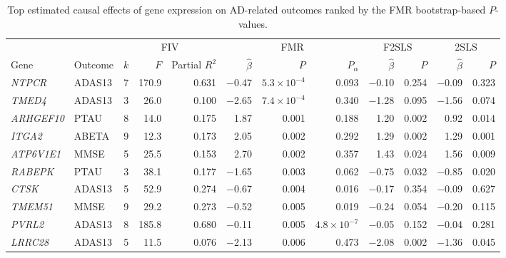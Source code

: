 \begin{table}[H]\centering\small
\caption{Top estimated causal effects of gene expression on AD-related outcomes ranked by the FMR bootstrap-based $P$-values.}\label{tab:2}
\begin{tabular}{llrrrrrrrrrr}
\toprule
 & & \multicolumn{3}{c}{FIV} & \multicolumn{3}{c}{FMR} & \multicolumn{2}{c}{F2SLS} & \multicolumn{2}{c}{2SLS} \\
\cmidrule(lr){3-5}\cmidrule(lr){6-8}\cmidrule(lr){9-10}\cmidrule(lr){11-12}
Gene & Outcome & $k$ & $F$ & Partial $R^2$ & $\hat\beta$ & $P$ & $P_\alpha$ & $\hat\beta$ & $P$ & $\hat\beta$ & $P$ \\
\midrule
\textit{NTPCR} & ADAS13 & 7 & 170.9 & 0.631 & $-$0.47 & $5.3\times10^{-4}$ & 0.093 & $-$0.10 & 0.254 & $-$0.09 & 0.323 \\
\textit{TMED4} & ADAS13 & 3 & 26.0 & 0.100 & $-$2.65 & $7.4\times10^{-4}$ & 0.340 & $-$1.28 & 0.095 & $-$1.56 & 0.074 \\
\textit{ARHGEF10} & PTAU & 8 & 14.0 & 0.175 & 1.87 & 0.001 & 0.188 & 1.20 & 0.002 & 0.92 & 0.014 \\
\textit{ITGA2} & ABETA & 9 & 12.3 & 0.173 & 2.05 & 0.002 & 0.292 & 1.29 & 0.002 & 1.29 & 0.001 \\
\textit{ATP6V1E1} & MMSE & 5 & 25.5 & 0.153 & 2.70 & 0.002 & 0.357 & 1.43 & 0.024 & 1.56 & 0.009 \\
\textit{RABEPK} & PTAU & 3 & 38.1 & 0.177 & $-$1.65 & 0.003 & 0.062 & $-$0.75 & 0.032 & $-$0.85 & 0.020 \\
\textit{CTSK} & ADAS13 & 5 & 52.9 & 0.274 & $-$0.67 & 0.004 & 0.016 & $-$0.17 & 0.354 & $-$0.09 & 0.627 \\
\textit{TMEM51} & MMSE & 9 & 29.2 & 0.273 & $-$0.52 & 0.005 & 0.019 & $-$0.24 & 0.054 & $-$0.20 & 0.115 \\
\textit{PVRL2} & ADAS13 & 8 & 185.8 & 0.680 & $-$0.11 & 0.005 & $4.8\times10^{-7}$ & $-$0.05 & 0.152 & $-$0.04 & 0.281 \\
\textit{LRRC28} & ADAS13 & 5 & 11.5 & 0.076 & $-$2.13 & 0.006 & 0.473 & $-$2.08 & 0.002 & $-$1.36 & 0.045 \\
\bottomrule
\end{tabular}
\end{table}
